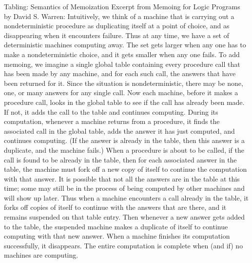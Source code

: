 \documentclass{beamer}
\begin{document}
\begin{frame}[fragile]{Tabling: Semantics of Memoization}
Excerpt from Memoing for Logic Programs by David S. Warren:
\tiny
Intuitively, we think of a machine that is carrying out a nondeterministic procedure as duplicating itself at a point of choice, and as disappearing when it encounters failure. Thus at any time, we have a set of deterministic machines computing away. The set gets larger when any one has to make a nondeterministic choice, and it gets smaller when any one fails. To add memoing, we imagine a single global table containing every procedure call that has been made by any machine, and for each such call, the answers that have been returned for it. Since the situation is nondeterministic, there may be none, one, or many answers for any single call. Now each machine, before it makes a procedure call, looks in the global table to see if the call has already been made. If not, it adds the call to the table and continues computing. During its computation, whenever a machine returns from a procedure, it finds the associated call in the global table, adds the answer it has just computed, and continues computing. (If the answer is already in the table, then this answer is a duplicate, and the machine fails.) When a procedure is about to be called, if the call is found to be already in the table, then for each associated answer in the table, the machine must fork off a new copy of itself to continue the computation with that answer. It is possible that not all the answers are in the table at this time; some may still be in the process of being computed by other machines and will show up later. Thus when a machine encounters a call already in the table, it forks off copies of itself to continue with the answers that are there, and it remains suspended on that table entry. Then whenever a new answer gets added to the table, the suspended machine makes a duplicate of itself to continue computing with that new answer. When a machine finishes its computation successfully, it disappears. The entire computation is complete when (and if) no machines are computing.
\end{frame}
\end{document}
